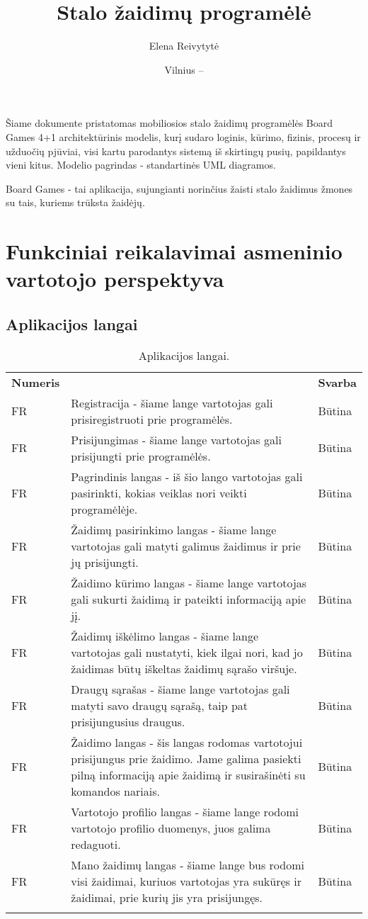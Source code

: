 \documentclass{VUMIFPSkursinis}
\title{Stalo žaidimų programėlė}
\author{Elena Reivytytė}
\date{Vilnius – \the\year}
\begin{document}
\maketitle

Šiame dokumente pristatomas mobiliosios stalo žaidimų programėlės Board Games 4+1 architektūrinis
modelis, kurį sudaro loginis, kūrimo, fizinis, procesų ir užduočių pjūviai, visi kartu parodantys
sistemą iš skirtingų pusių, papildantys vieni kitus. Modelio pagrindas - standartinės UML diagramos.

\tableofcontents

Board Games - tai aplikacija, sujungianti norinčius žaisti stalo žaidimus žmones
su tais, kuriems trūksta žaidėjų. 

\section{Funkciniai reikalavimai asmeninio vartotojo perspektyva}

\newcommand\rownumberfr{\stepcounter{frcount}\arabic{frcount}}

\subsection{Aplikacijos langai}
\begin{longtable}{ | >{\centering}m{2cm} | m{10cm} | >{\centering}m{2.5cm} | } \hline
\multicolumn{3}{ |l| }{\textbf{Aplikacijos langai:}} \tabularnewline \hline
\textbf{Numeris} & \centering{\textbf{Reikalavimas}} & \textbf{Svarba} \tabularnewline \hline
FR\rownumberfr & Registracija - šiame lange vartotojas gali prisiregistruoti prie programėlės. & Būtina\tabularnewline \hline
FR\rownumberfr & Prisijungimas - šiame lange vartotojas gali prisijungti prie programėlės. & Būtina\tabularnewline \hline
FR\rownumberfr & Pagrindinis langas - iš šio lango vartotojas gali pasirinkti, kokias veiklas nori veikti programėlėje. & Būtina\tabularnewline \hline
FR\rownumberfr & Žaidimų pasirinkimo langas - šiame lange vartotojas gali matyti galimus žaidimus ir prie jų prisijungti. & Būtina\tabularnewline \hline
FR\rownumberfr & Žaidimo kūrimo langas - šiame lange vartotojas gali sukurti žaidimą ir pateikti informaciją apie jį. & Būtina\tabularnewline \hline
FR\rownumberfr & Žaidimų iškėlimo langas - šiame lange vartotojas gali nustatyti, kiek ilgai nori, kad jo žaidimas būtų iškeltas žaidimų sąrašo viršuje. & Būtina\tabularnewline \hline
FR\rownumberfr & Draugų sąrašas - šiame lange vartotojas gali matyti savo draugų sąrašą, taip pat prisijungusius draugus. & Būtina\tabularnewline \hline
FR\rownumberfr & Žaidimo langas - šis langas rodomas vartotojui prisijungus prie žaidimo. Jame galima pasiekti pilną informaciją apie žaidimą ir susirašinėti su komandos nariais. & Būtina\tabularnewline \hline
FR\rownumberfr & Vartotojo profilio langas - šiame lange rodomi vartotojo profilio duomenys, juos galima redaguoti. & Būtina\tabularnewline \hline
FR\rownumberfr & Mano žaidimų langas - šiame lange bus rodomi visi žaidimai, kuriuos vartotojas yra sukūręs ir žaidimai, prie kurių jis yra prisijungęs. & Būtina\tabularnewline \hline
\caption{Aplikacijos langai.}
\end{longtable}
\end{document}
